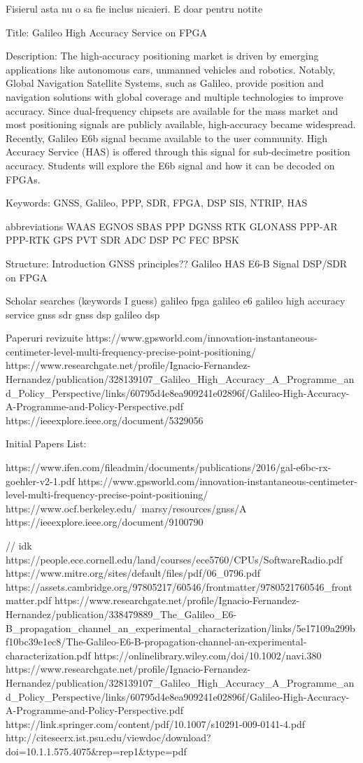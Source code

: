 Fisierul asta nu o sa fie inclus nicaieri. E doar pentru notite 

Title:
Galileo High Accuracy Service on FPGA

Description:
The high-accuracy positioning market is driven by emerging applications like autonomous cars, unmanned vehicles and robotics. 
Notably, Global Navigation Satellite Systems, such as Galileo, provide position and navigation solutions with global coverage and multiple technologies to improve accuracy. 
Since dual-frequency chipsets are available for the mass market and most positioning signals are publicly available, high-accuracy became widespread.
Recently, Galileo E6b signal became available to the user community. High Accuracy Service (HAS) is offered through this signal for sub-decimetre position accuracy. 
Students will explore the E6b signal and how it can be decoded on FPGAs.

Keywords:
GNSS, Galileo, PPP, SDR, FPGA, DSP
SIS, NTRIP, HAS

abbreviations
WAAS
EGNOS
SBAS
PPP
DGNSS
RTK
GLONASS
PPP-AR
PPP-RTK
GPS
PVT
SDR
ADC
DSP
PC
FEC
BPSK

Structure:
Introduction
GNSS principles??
Galileo HAS
E6-B Signal
DSP/SDR on FPGA

Scholar searches (keywords I guess)
galileo fpga
galileo e6
galileo high accuracy service
gnss sdr
gnss dsp
galileo dsp

Paperuri revizuite
https://www.gpsworld.com/innovation-instantaneous-centimeter-level-multi-frequency-precise-point-positioning/
https://www.researchgate.net/profile/Ignacio-Fernandez-Hernandez/publication/328139107_Galileo_High_Accuracy_A_Programme_and_Policy_Perspective/links/60795d4e8ea909241e02896f/Galileo-High-Accuracy-A-Programme-and-Policy-Perspective.pdf
https://ieeexplore.ieee.org/document/5329056

Initial Papers List:

https://www.ifen.com/fileadmin/documents/publications/2016/gal-e6bc-rx-goehler-v2-1.pdf
https://www.gpsworld.com/innovation-instantaneous-centimeter-level-multi-frequency-precise-point-positioning/
https://www.ocf.berkeley.edu/~marsy/resources/gnss/A%
https://ieeexplore.ieee.org/document/9100790

// idk
https://people.ece.cornell.edu/land/courses/ece5760/CPUs/SoftwareRadio.pdf
https://www.mitre.org/sites/default/files/pdf/06_0796.pdf
https://assets.cambridge.org/97805217/60546/frontmatter/9780521760546_frontmatter.pdf
https://www.researchgate.net/profile/Ignacio-Fernandez-Hernandez/publication/338479889_The_Galileo_E6-B_propagation_channel_an_experimental_characterization/links/5e17109a299bf10bc39e1ec8/The-Galileo-E6-B-propagation-channel-an-experimental-characterization.pdf
https://onlinelibrary.wiley.com/doi/10.1002/navi.380
https://www.researchgate.net/profile/Ignacio-Fernandez-Hernandez/publication/328139107_Galileo_High_Accuracy_A_Programme_and_Policy_Perspective/links/60795d4e8ea909241e02896f/Galileo-High-Accuracy-A-Programme-and-Policy-Perspective.pdf
https://link.springer.com/content/pdf/10.1007/s10291-009-0141-4.pdf
http://citeseerx.ist.psu.edu/viewdoc/download?doi=10.1.1.575.4075&rep=rep1&type=pdf


